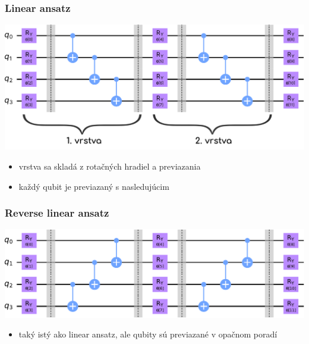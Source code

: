 \documentclass{beamer}
\begin{document}
\begin{frame}
    \frametitle{Linear ansatz}
	\includegraphics[width=1\textwidth]{anstaz-linear-layers.pdf}
    \begin{itemize}
        \item vrstva sa skladá z rotačných hradiel a previazania
        \item každý qubit je previazaný s nasledujúcim
    \end{itemize}
\end{frame}

\begin{frame}
    \frametitle{Reverse linear ansatz}
	\includegraphics[width=1\textwidth]{ansatz-reverse-linear.pdf}
    \begin{itemize}
        \item taký istý ako linear ansatz, ale qubity sú previazané v opačnom poradí
    \end{itemize}
\end{frame}

\end{document}
